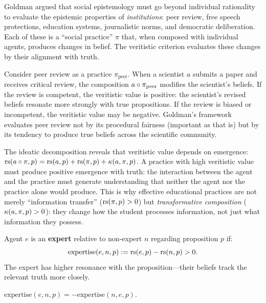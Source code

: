\begin{interpretation}
Goldman argued that social epistemology must go beyond individual rationality to
evaluate the epistemic properties of \emph{institutions}: peer review, free speech
protections, education systems, journalistic norms, and democratic deliberation.
Each of these is a ``social practice'' $\pi$ that, when composed with individual
agents, produces changes in belief. The veritistic criterion evaluates these
changes by their alignment with truth.

Consider peer review as a practice $\pi_{\text{peer}}$. When a scientist $a$
submits a paper and receives critical review, the composition $a \circ
\pi_{\text{peer}}$ modifies the scientist's beliefs. If the review is competent,
the veritistic value is positive: the scientist's revised beliefs resonate more
strongly with true propositions. If the review is biased or incompetent, the
veritistic value may be negative. Goldman's framework evaluates peer review not
by its procedural fairness (important as that is) but by its tendency to produce
true beliefs across the scientific community.

The ideatic decomposition reveals that veritistic value depends on emergence:
$\mathrm{rs}(a \circ \pi, p) = \mathrm{rs}(a, p) + \mathrm{rs}(\pi, p) + \kappa(a, \pi, p)$.
A practice with high veritistic value must produce positive emergence with
truth: the interaction between the agent and the practice must generate
understanding that neither the agent nor the practice alone would produce.
This is why effective educational practices are not merely ``information
transfer'' ($\mathrm{rs}(\pi, p) > 0$) but \emph{transformative composition}
($\kappa(a, \pi, p) > 0$): they change how the student processes information,
not just what information they possess.
\end{interpretation}

\begin{definition}
\label{def:expert-id}
Agent $e$ is an \textbf{expert} relative to non-expert $n$ regarding proposition
$p$ if:
\[
  \mathrm{expertise}(e, n, p) := \mathrm{rs}(e, p) - \mathrm{rs}(n, p) > 0.
\]
The expert has higher resonance with the proposition---their beliefs track the
relevant truth more closely.
\end{definition}

\begin{theorem}
\label{thm:expert-antisymm}
$\mathrm{expertise}(e, n, p) = -\mathrm{expertise}(n, e, p)$.
\end{theorem}

